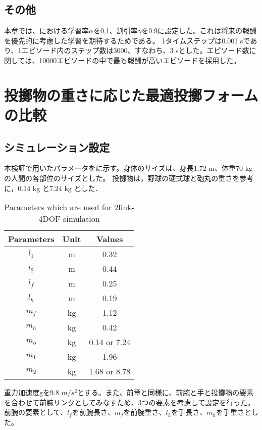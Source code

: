 \subsection{その他}
本章では、における学習率$\alpha$を0.1、割引率$\gamma$を0.9に設定した。これは将来の報酬を優先的に考慮した学習を期待するためである。
1タイムステップは0.001 sであり、1エピソード内のステップ数は3000、すなわち、3 sとした。エピソード数に関しては、10000エピソードの中で最も報酬が高いエピソードを採用した。

\section{投擲物の重さに応じた最適投擲フォームの比較}
\subsection{シミュレーション設定}
本検証で用いたパラメータをに示す。身体のサイズは、身長1.72 m、体重70 kgの人間の各部位のサイズとした。
投擲物は，野球の硬式球と砲丸の重さを参考に，0.14 kg と7.24 kg とした．
\begin{table}[tb]
  \begin{center}
    \caption{Parameters which are used for 2link-4DOF simulation}

    \begin{tabular}{c c c}
      \hline
      Parameters & Unit & Values \\
      \hline
      $l_{1}$ & m & 0.32 \\
      $l_{2}$ & m & 0.44 \\
      $l_{f}$ & m & 0.25 \\
      $l_{h}$ & m & 0.19 \\
      $m_{f}$ & kg & 1.12 \\
      $m_{h}$ & kg & 0.42 \\
      $m_{o}$ & kg & 0.14 or 7.24 \\
      $m_{1}$ & kg & 1.96 \\
      $m_{2}$ & kg & 1.68 or 8.78 \\
      \hline
    \end{tabular}
  \end{center}
\end{table}
重力加速度gを9.8 $m/s^{2}$とする。また、前章と同様に、前腕と手と投擲物の要素を合わせて前腕リンクとしてみなすため、3つの要素を考慮して設定を行った。
前腕の要素として、$l_{f}$を前腕長さ、$m_{f}$を前腕重さ、$l_{h}$を手長さ、$m_{h}$を手重さとした。\\


